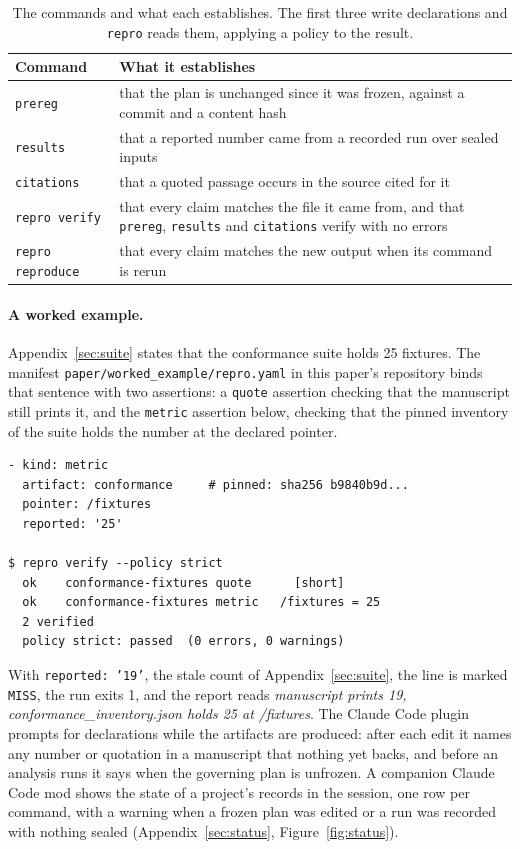 \documentclass{article}
\newcommand{\code}[1]{\texttt{#1}}
\newcommand{\prereg}{\code{prereg}}
\newcommand{\results}{\code{results}}
\newcommand{\citations}{\code{citations}}
\newcommand{\repro}{\code{repro}}
\newcommand{\reproverify}{\code{repro verify}}
\begin{document}
\begin{table}[h]
\centering
\small
\caption{The commands and what each establishes. The first three write declarations and
\repro{} reads them, applying a policy to the result.}
\label{tab:commands}
\begin{tabular}{@{}l>{\raggedright\arraybackslash}p{}@{}}
\toprule
\textbf{Command} & \textbf{What it establishes} \\
\midrule
\prereg{} & that the plan is unchanged since it was frozen, against a commit and a content hash \\
\results{} & that a reported number came from a recorded run over sealed inputs \\
\citations{} & that a quoted passage occurs in the source cited for it \\
\reproverify{} & that every claim matches the file it came from, and that \prereg{}, \results{} and \citations{} verify with no errors \\
\code{repro reproduce} & that every claim matches the new output when its command is rerun \\
\bottomrule
\end{tabular}
\end{table}

\paragraph{A worked example.} Appendix~\ref{sec:suite} states that the conformance suite holds 25
fixtures. The manifest \code{paper/worked\_example/repro.yaml} in this paper's repository binds
that sentence with two assertions: a \code{quote} assertion checking that the manuscript still
prints it, and the \code{metric} assertion below, checking that the pinned inventory of the suite
holds the number at the declared pointer.
{\footnotesize
\begin{verbatim}
- kind: metric
  artifact: conformance     # pinned: sha256 b9840b9d...
  pointer: /fixtures
  reported: '25'

$ repro verify --policy strict
  ok    conformance-fixtures quote      [short]
  ok    conformance-fixtures metric   /fixtures = 25
  2 verified
  policy strict: passed  (0 errors, 0 warnings)
\end{verbatim}}
\noindent With \code{reported: '19'}, the stale count of Appendix~\ref{sec:suite}, the line is
marked \code{MISS}, the run exits 1, and the report reads \emph{manuscript prints 19,
conformance\_inventory.json holds 25 at /fixtures}. The Claude Code plugin prompts for
declarations while the artifacts are produced: after each edit it names any number or quotation in
a manuscript that nothing yet backs, and before an analysis runs it says when the governing plan is
unfrozen. A companion Claude Code mod shows the state of a project's
records in the session, one row per command, with a warning when a frozen plan was edited or a run
was recorded with nothing sealed (Appendix~\ref{sec:status}, Figure~\ref{fig:status}).
\end{document}
